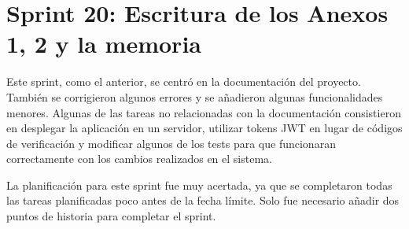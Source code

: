 \section{Sprint 20: Escritura de los Anexos 1, 2 y la memoria}
\label{anexo3:sec:sprint20}

Este sprint, como el anterior, se centró en la documentación del proyecto. También se corrigieron
algunos errores y se añadieron algunas funcionalidades menores. Algunas de las tareas no
relacionadas con la documentación consistieron en desplegar la aplicación en un servidor,
utilizar tokens JWT en lugar de códigos de verificación y modificar algunos de los tests para
que funcionaran correctamente con los cambios realizados en el sistema.

La planificación para este sprint fue muy acertada, ya que se completaron todas las tareas
planificadas poco antes de la fecha límite. Solo fue necesario añadir dos puntos de historia
para completar el sprint.

